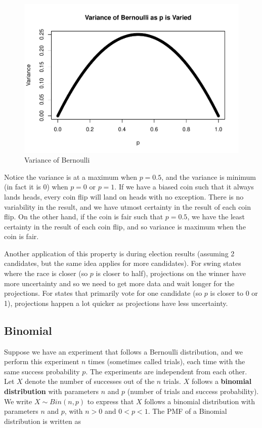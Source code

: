 \documentclass[
]{book}
\begin{document}
\begin{figure}
\centering
\includegraphics{bookdown-demo_files/figure-latex/3-varBern-1.pdf}
\caption{\label{fig:3-varBern}Variance of Bernoulli}
\end{figure}

Notice the variance is at a maximum when \(p=0.5\), and the variance is minimum (in fact it is 0) when \(p=0\) or \(p=1\). If we have a biased coin such that it always lands heads, every coin flip will land on heads with no exception. There is no variability in the result, and we have utmost certainty in the result of each coin flip. On the other hand, if the coin is fair such that \(p=0.5\), we have the least certainty in the result of each coin flip, and so variance is maximum when the coin is fair.

Another application of this property is during election results (assuming 2 candidates, but the same idea applies for more candidates). For swing states where the race is closer (so \(p\) is closer to half), projections on the winner have more uncertainty and so we need to get more data and wait longer for the projections. For states that primarily vote for one candidate (so \(p\) is closer to 0 or 1), projections happen a lot quicker as projections have less uncertainty.

\subsection{Binomial}\label{binomial}

Suppose we have an experiment that follows a Bernoulli distribution, and we perform this experiment \(n\) times (sometimes called trials), each time with the same success probability \(p\). The experiments are independent from each other. Let \(X\) denote the number of successes out of the \(n\) trials. \(X\) follows a \textbf{binomial distribution} with parameters \(n\) and \(p\) (number of trials and success probability). We write \(X \sim Bin(n,p)\) to express that \(X\) follows a binomial distribution with parameters \(n\) and \(p\), with \(n>0\) and \(0<p<1\). The PMF of a Binomial distribution is written as
\end{document}
